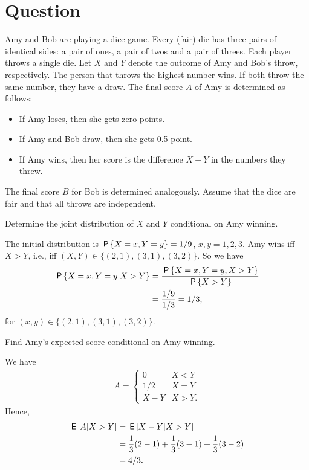\section{Question}


Amy and Bob are playing a dice game. Every (fair) die has three pairs of identical sides: a pair of ones, a pair of twos and a pair of threes. Each player throws a single die. Let $X$ and $Y$ denote the outcome of Amy and Bob's throw, respectively. The person that throws the highest number wins. If both throw the same number, they have a draw. The final score $A$ of Amy is determined as follows:
\begin{itemize}
    \item If Amy loses, then she gets zero points.
    \item If Amy and Bob draw, then she gets 0.5 point.
    \item If Amy wins, then her score is the difference $X -Y$ in the numbers they threw.
\end{itemize}
The final score $B$ for Bob is determined analogously. Assume that the dice are fair and that all throws are independent.

\begin{exercise}[1]
Determine the joint distribution of $X$ and $Y$ conditional on Amy winning.
\begin{solution}
The initial distribution is $\P{X = x, Y = y} = 1/9$, $x,y = 1,2,3$. Amy wins iff $X>Y$, i.e., iff $(X,Y) \in \{(2,1), (3,1), (3,2)\}$. So we have
\begin{align}
    \P{X=x,Y=y | X>Y} &= \frac{\P{X=x,Y=y,X>Y}}{\P{X>Y}} \\
    &= \frac{1/9}{1/3} = 1/3,
\end{align}
for $(x,y) \in \{(2,1), (3,1), (3,2)\}$.
\end{solution}
\end{exercise}

\begin{exercise}[1.5]
Find Amy's expected score conditional on Amy winning.
\begin{solution}
We have
\begin{align}
    A = \begin{cases}
    0 &X < Y \\
    1/2 &X = Y \\
    X - Y &X > Y.
    \end{cases}
\end{align}
Hence,
\begin{align}
    \E{A|X>Y} &= \E{X-Y|X>Y} \\
    &= \frac{1}{3} (2-1) + \frac{1}{3} (3-1) + \frac{1}{3} (3-2) \\
    &= 4/3.
\end{align}
\end{solution}
\end{exercise}

